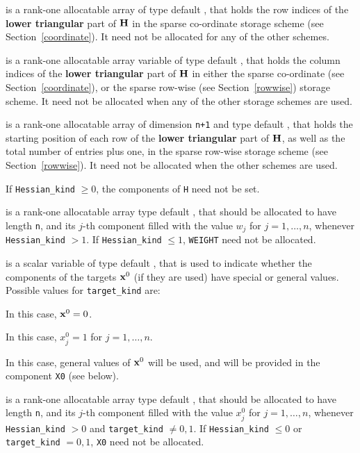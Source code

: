 \documentclass{galahad}
\begin{document}
\begin{description}
\begin{description}
 is a rank-one allocatable array of type default \integer,
that holds the row indices of the {\bf lower triangular} part of ${\mathbf{H}}$
in the sparse co-ordinate storage scheme (see Section~\ref{coordinate}).
It need not be allocated for any of the other schemes.

 is a rank-one allocatable array variable of type default \integer,
that holds the column indices of the {\bf lower triangular} part of
${\mathbf{H}}$ in either the sparse co-ordinate
(see Section~\ref{coordinate}), or the sparse row-wise
(see Section~\ref{rowwise}) storage scheme.
It need not be allocated when any of the other storage schemes are used.

 is a rank-one allocatable array of dimension {\tt n+1} and type
default \integer, that holds the starting position of
each row of the {\bf lower triangular} part of ${\mathbf{H}}$, as well
as the total number of entries plus one, in the sparse row-wise storage
scheme (see Section~\ref{rowwise}). It need not be allocated when the
other schemes are used.
\end{description}
If {\tt Hessian\_kind} $\geq 0$, the components of {\tt H} need not be set.

 is a rank-one allocatable array type default \realdp, that
should be allocated to have length {\tt n}, and its $j$-th component
filled with the value $w_{j}$ for $j = 1, \ldots , n$,
whenever {\tt Hessian\_kind} $>1$.
If {\tt Hessian\_kind} $\leq 1$, {\tt WEIGHT} need not be allocated.

 is a scalar variable of type default \integer,
that is used to indicate whether the components of the targets ${\mathbf{x}}^0$
(if they are used) have special or general values. Possible values for
{\tt target\_kind} are:
\begin{description}
  In this case, ${\mathbf{x}}^0 = 0$.

 In this case, $x^0_{j} = 1$ for $j = 1, \ldots , n$.

 In this case, general values of ${\mathbf{x}}^0$ will be used,
     and will be provided in the component {\tt X0} (see below).
\end{description}

 is a rank-one allocatable array type default \realdp, that
should be allocated to have length {\tt n}, and its $j$-th component
filled with the value $x_{j}^0$ for $j = 1, \ldots , n$,
whenever {\tt Hessian\_kind} $>0$ and {\tt target\_kind} $\neq 0,1$.
If {\tt Hessian\_kind} $\leq 0$ or {\tt target\_kind} $= 0,1$,
{\tt X0} need not be allocated.


\end{description}
\end{document}
